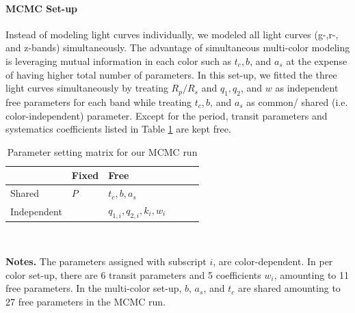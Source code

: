 \paragraph{MCMC Set-up}
Instead of modeling light curves individually, we modeled all light curves (g-,r-, and z-bands) simultaneously. The advantage of simultaneous multi-color modeling is leveraging mutual information in each color such as $t_c, b$, and $a_s$ at the expense of having higher total number of parameters. In this set-up, we fitted the three light curves simultaneously by treating $R_p/R_s$ and $q_1, q_2$, and $w$ as independent free parameters for each band while treating $t_c, b$, and $a_s$ as common/ shared (i.e. color-independent) parameter. Except for the period, %
transit parameters and systematics coefficients listed in Table \ref{tab:param_mcmc} are kept free. %

\begin{table}
\centering
\caption{Parameter setting matrix for our MCMC run}
\label{tab:param_mcmc}
\begin{tabular}{llllll}
                     & Fixed   & Free   \\ \hline
Shared      & $P$     & $t_c, b, a_s$   \\
Independent &         & $q_{1,i},q_{2,i}, k_i, w_i$ \\
\hline
\end{tabular} \\
\raggedright \textbf{Notes.} The parameters assigned with subscript $i$, are color-dependent. In per color set-up, there are 6 transit parameters and 5 coefficients $w_i$, amounting to 11 free parameters. In the multi-color set-up, $b$, $a_s$, and $t_c$ are shared amounting to 27 free parameters in the MCMC run. 
\end{table}

